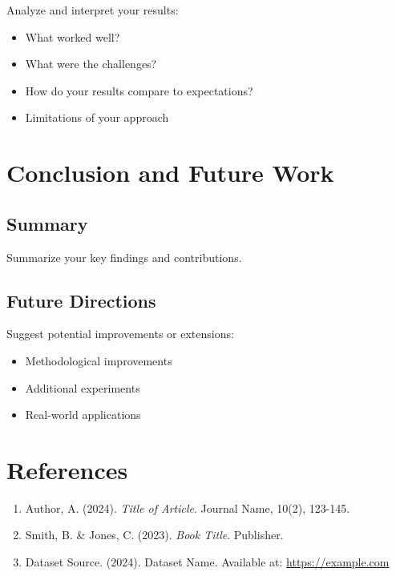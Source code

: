 \documentclass[11pt,a4paper]{article}
\begin{document}
Analyze and interpret your results:
\begin{itemize}
    \item What worked well?
    \item What were the challenges?
    \item How do your results compare to expectations?
    \item Limitations of your approach
\end{itemize}

\section{Conclusion and Future Work}
\label{sec:conclusion}

\subsection{Summary}
Summarize your key findings and contributions.

\subsection{Future Directions}
Suggest potential improvements or extensions:
\begin{itemize}
    \item Methodological improvements
    \item Additional experiments
    \item Real-world applications
\end{itemize}

\newpage
\section*{References}


\begin{enumerate}
    \item Author, A. (2024). \textit{Title of Article}. Journal Name, 10(2), 123-145.
    \item Smith, B. \& Jones, C. (2023). \textit{Book Title}. Publisher.
    \item Dataset Source. (2024). Dataset Name. Available at: \url{https://example.com}
\end{enumerate}
\end{document}
